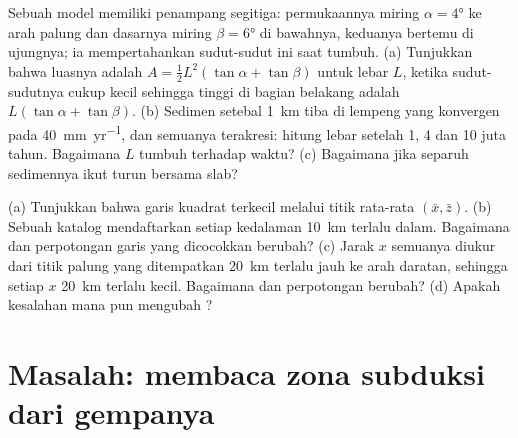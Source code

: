 \begin{exercise}[$\star\star\star$]\label{exo:b1:active-margins:11}
Sebuah  model memiliki penampang segitiga: permukaannya miring $\alpha = \ang{4}$ ke arah palung dan dasarnya miring $\beta = \ang{6}$ di bawahnya, keduanya bertemu di ujungnya; ia mempertahankan sudut-sudut ini saat tumbuh. (a) Tunjukkan bahwa luasnya adalah $A = \frac12 L^2(\tan\alpha + \tan\beta)$ untuk lebar $L$, ketika sudut-sudutnya cukup kecil sehingga tinggi di bagian belakang adalah $L(\tan\alpha + \tan\beta)$. (b) Sedimen setebal \qty{1}{km} tiba di lempeng yang konvergen pada \qty{40}{mm.yr^{-1}}, dan semuanya terakresi: hitung lebar setelah 1, 4 dan 10 juta tahun. Bagaimana $L$ tumbuh terhadap waktu? (c) Bagaimana jika separuh sedimennya ikut turun bersama slab?
\end{exercise}

\begin{exercise}[$\star\star\star$]\label{exo:b1:active-margins:12}
(a) Tunjukkan bahwa garis kuadrat terkecil melalui titik rata-rata $(\bar x, \bar z)$. (b) Sebuah katalog mendaftarkan setiap kedalaman \qty{10}{km} terlalu dalam. Bagaimana  dan perpotongan garis yang dicocokkan berubah? (c) Jarak $x$ semuanya diukur dari titik palung yang ditempatkan \qty{20}{km} terlalu jauh ke arah daratan, sehingga setiap $x$ \qty{20}{km} terlalu kecil. Bagaimana  dan perpotongan berubah? (d) Apakah kesalahan mana pun mengubah ?
\end{exercise}

\section{Masalah: membaca zona subduksi dari gempanya}


